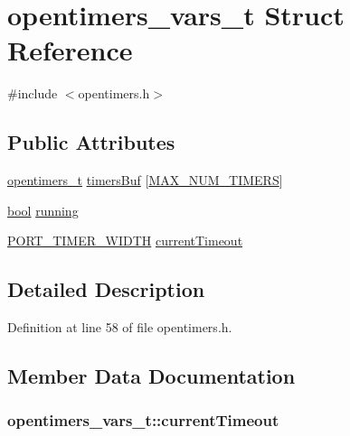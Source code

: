 \hypertarget{structopentimers__vars__t}{}\section{opentimers\+\_\+vars\+\_\+t Struct Reference}
\label{structopentimers__vars__t}


{\ttfamily \#include $<$opentimers.\+h$>$}

\subsection*{Public Attributes}
\begin{DoxyCompactItemize}
\item 
\hyperlink{structopentimers__t}{opentimers\+\_\+t} \hyperlink{structopentimers__vars__t_ad8b36924bdd25bdb1fe6f5b5ec255e83}{timers\+Buf} \mbox{[}\hyperlink{group___open_timers_gaacf8ae36c6e504e7361613a7d9a85d69}{M\+A\+X\+\_\+\+N\+U\+M\+\_\+\+T\+I\+M\+E\+RS}\mbox{]}
\item 
\hyperlink{_p_e___types_8h_a97a80ca1602ebf2303258971a2c938e2}{bool} \hyperlink{structopentimers__vars__t_af471225bd8f9e96d7976c716438ca7c0}{running}
\item 
\hyperlink{z1_2board__info_8h_abe66b9c1c60db84f2a99f2b827275f24}{P\+O\+R\+T\+\_\+\+T\+I\+M\+E\+R\+\_\+\+W\+I\+D\+TH} \hyperlink{structopentimers__vars__t_a6af862760445105c8664bc19385c55fc}{current\+Timeout}
\end{DoxyCompactItemize}


\subsection{Detailed Description}


Definition at line 58 of file opentimers.\+h.



\subsection{Member Data Documentation}
\subsubsection[{\texorpdfstring{current\+Timeout}{currentTimeout}}]{ opentimers\+\_\+vars\+\_\+t\+::current\+Timeout}\hypertarget{structopentimers__vars__t_a6af862760445105c8664bc19385c55fc}{}\label{structopentimers__vars__t_a6af862760445105c8664bc19385c55fc}


